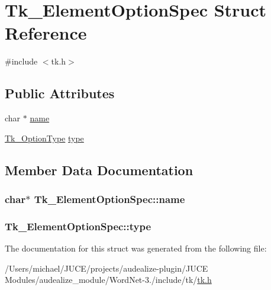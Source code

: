 \hypertarget{struct_tk___element_option_spec}{}\section{Tk\+\_\+\+Element\+Option\+Spec Struct Reference}
\label{struct_tk___element_option_spec}


{\ttfamily \#include $<$tk.\+h$>$}

\subsection*{Public Attributes}
\begin{DoxyCompactItemize}
\item 
char $\ast$ \hyperlink{struct_tk___element_option_spec_a3e67de5f1ef5cda2be7cfce7ddbdb49e}{name}
\item 
\hyperlink{tk_8h_a440f69c905cb5ac2c6a744380e595391}{Tk\+\_\+\+Option\+Type} \hyperlink{struct_tk___element_option_spec_ad8e53a5ce17f76b90d096f8fa5006303}{type}
\end{DoxyCompactItemize}


\subsection{Member Data Documentation}
\subsubsection[{\texorpdfstring{name}{name}}]{\setlength{\rightskip}{0pt plus 5cm}char$\ast$ Tk\+\_\+\+Element\+Option\+Spec\+::name}\hypertarget{struct_tk___element_option_spec_a3e67de5f1ef5cda2be7cfce7ddbdb49e}{}\label{struct_tk___element_option_spec_a3e67de5f1ef5cda2be7cfce7ddbdb49e}
\subsubsection[{\texorpdfstring{type}{type}}]{ Tk\+\_\+\+Element\+Option\+Spec\+::type}\hypertarget{struct_tk___element_option_spec_ad8e53a5ce17f76b90d096f8fa5006303}{}\label{struct_tk___element_option_spec_ad8e53a5ce17f76b90d096f8fa5006303}


The documentation for this struct was generated from the following file\+:\begin{DoxyCompactItemize}
\item 
/\+Users/michael/\+J\+U\+C\+E/projects/audealize-\/plugin/\+J\+U\+C\+E Modules/audealize\+\_\+module/\+Word\+Net-\/3./include/tk/\hyperlink{tk_8h}{tk.\+h}\end{DoxyCompactItemize}
